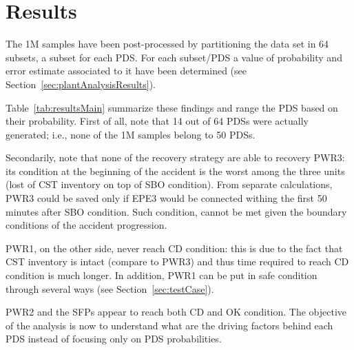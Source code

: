\section{Results}
\label{sec:results}
The 1M samples have been post-processed by partitioning the data set in 64 subsets, a subset for each
PDS. 
For each subset/PDS a value of probability and error estimate associated to it have been determined 
(see Section~\ref{sec:plantAnalysisResults}).

Table~\ref{tab:resultsMain} summarize these findings and range the PDS based on their probability.
First of all, note that 14 out of 64 PDSs were actually generated; i.e., none of the 1M samples 
belong to 50 PDSs.

Secondarily, note that none of the recovery strategy are able to recovery PWR3: its condition at 
the beginning of the accident is the worst among the three units (lost of CST inventory on top of 
SBO condition). From separate calculations, PWR3 could be saved only if EPE3 would be connected
withing the first 50 minutes after SBO condition. Such condition, cannot be met given the boundary
conditions of the accident progression.

PWR1, on the other side, never reach CD condition: this is due to the fact that CST inventory is 
intact (compare to PWR3) and thus time required to reach CD condition is much longer. In addition,
PWR1 can be put in safe condition through several ways (see Section~\ref{sec:testCase}).

PWR2 and the SFPs appear to reach both CD and OK condition. The objective of the analysis is now 
to understand what are the driving factors behind each PDS instead of focusing only on PDS 
probabilities. 

